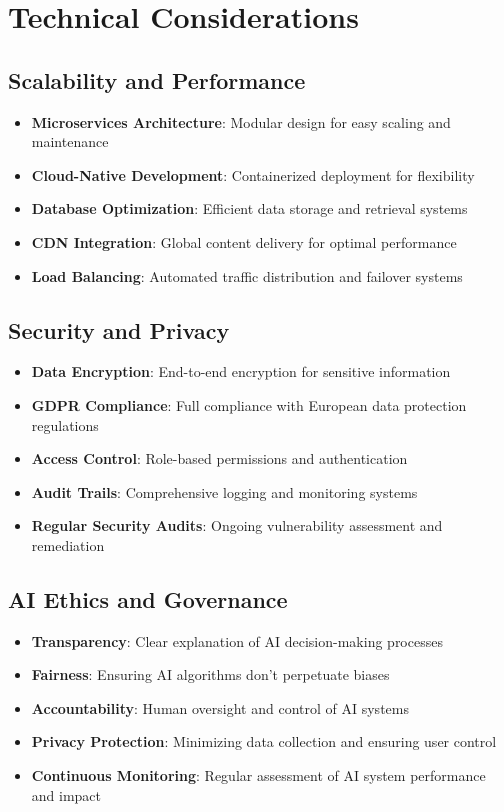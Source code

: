 \section{Technical Considerations}

\subsection{Scalability and Performance}
\begin{itemize}
    \item \textbf{Microservices Architecture}: Modular design for easy scaling and maintenance
    \item \textbf{Cloud-Native Development}: Containerized deployment for flexibility
    \item \textbf{Database Optimization}: Efficient data storage and retrieval systems
    \item \textbf{CDN Integration}: Global content delivery for optimal performance
    \item \textbf{Load Balancing}: Automated traffic distribution and failover systems
\end{itemize}

\subsection{Security and Privacy}
\begin{itemize}
    \item \textbf{Data Encryption}: End-to-end encryption for sensitive information
    \item \textbf{GDPR Compliance}: Full compliance with European data protection regulations
    \item \textbf{Access Control}: Role-based permissions and authentication
    \item \textbf{Audit Trails}: Comprehensive logging and monitoring systems
    \item \textbf{Regular Security Audits}: Ongoing vulnerability assessment and remediation
\end{itemize}

\subsection{AI Ethics and Governance}
\begin{itemize}
    \item \textbf{Transparency}: Clear explanation of AI decision-making processes
    \item \textbf{Fairness}: Ensuring AI algorithms don't perpetuate biases
    \item \textbf{Accountability}: Human oversight and control of AI systems
    \item \textbf{Privacy Protection}: Minimizing data collection and ensuring user control
    \item \textbf{Continuous Monitoring}: Regular assessment of AI system performance and impact
\end{itemize}

